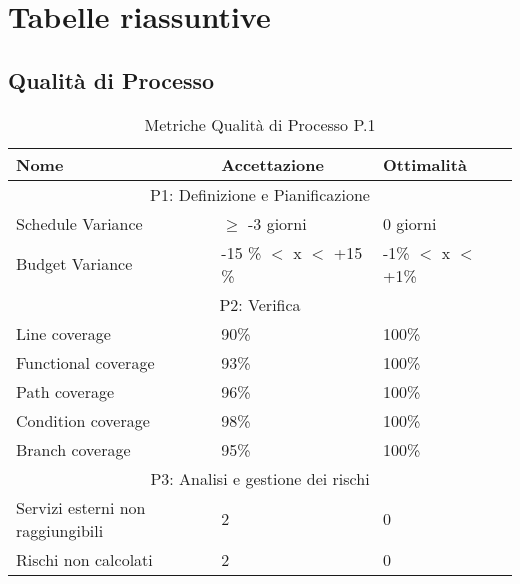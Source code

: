 \section{Tabelle riassuntive}
    \subsection{Qualità di Processo}
\begin{table}[!htpb]
	\centering
	\renewcommand{\arraystretch}{2} 
	\begin{tabular}{|p{8cm}|p{3.5cm}|p{3.5cm}|}
		\hline
		\rowcolor{orange!50} 
		\textbf{Nome} & \textbf{Accettazione} & \textbf{Ottimalità} \\
		\hline
		\multicolumn{3}{|c|}{P1: Definizione e Pianificazione}\\
		\hline
		Schedule Variance & $\geq$ -3 giorni &0 giorni \\
		\hline
		Budget Variance & -15 \% $<$ x $<$ +15 \% & -1\% $<$ x $<$ +1\% \\ 
		\hline
		\multicolumn{3}{|c|}{P2: Verifica} \\
		\hline
		Line coverage & 90\% & 100\% \\
		\hline
		Functional coverage & 93\% & 100\% \\
		\hline
		Path coverage & 96\% & 100\% \\
		\hline
		Condition coverage & 98\% & 100\% \\
		\hline
		Branch coverage & 95\% & 100\% \\
		\hline
		\multicolumn{3}{|c|}{P3: Analisi e gestione dei rischi} \\
		\hline
		Servizi esterni non raggiungibili & 2 & 0 \\
		\hline
		Rischi non calcolati & 2 & 0 \\
		\hline
	\end{tabular}
	\caption{Metriche Qualità di Processo P.1}
\end{table}

